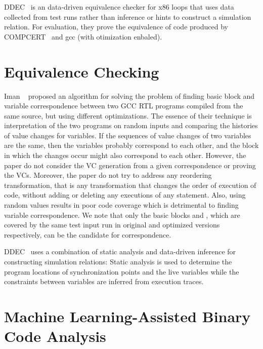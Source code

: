 DDEC~\cite{DDEC:OOPSLA:2013} is an data-driven equivalence checker for x86
loops that uses data collected from test runs rather than inference or hints to
construct a simulation relation. For evaluation, they prove the equivalence of
code produced by \textsc{COMPCERT}~\cite{CompCert:FM06} and gcc (with
    otimization enbaled).

 
\section{Equivalence Checking}

Iman \etal~\cite{Iman2005} proposed an algorithm for solving the problem of
finding basic block and variable correspondence between two GCC RTL programs
compiled from the same source, but using different optimizations.  The essence
of their technique is interpretation of the two programs on random inputs and
comparing the histories of value changes for variables. 
If the sequences of value changes of two variables are the same, then the
variables probably correspond to each other, and the block in which the changes
occur might also correspond to each other.  However, the paper do not consider
the VC generation from a given correspondence or proving the VCs.  Moreover,
    the paper do not try to address any reordering transformation, that is any
    transformation that changes the order of execution of code, without adding
    or deleting any executions of any statement. Also, using random values
    results in poor code coverage which is detrimental to finding variable
    correspondence. We note that only the basic blocks  and , which
    are covered by the same test input run in original and optimized versions
    respectively, can be the candidate for correspondence.     

DDEC~\cite{DDEC:OOPSLA:2013} uses a combination of static analysis and
data-driven inference for constructing simulation relations: Static analysis is
used to determine the program locations of synchronization points and the live
variables while the constraints between variables are inferred from execution
traces.

\section{Machine Learning-Assisted Binary Code Analysis}

